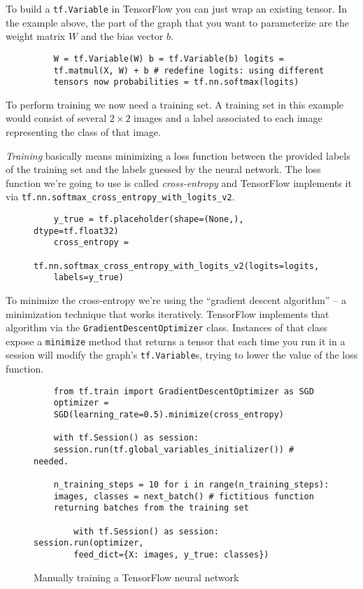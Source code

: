 To build a \texttt{tf.Variable} in TensorFlow you can just
wrap an existing tensor. In the example above, the part of
the graph that you want to parameterize are the weight
matrix $W$ and the bias vector $b$.

\begin{figure}
  \begin{verbatim}
    W = tf.Variable(W) b = tf.Variable(b) logits =
    tf.matmul(X, W) + b # redefine logits: using different
    tensors now probabilities = tf.nn.softmax(logits)
  \end{verbatim}
  \caption{}
\end{figure}

To perform training we now need a training set. A training
set in this example would consist of several \(2 \times 2\)
images and a label associated to each image representing the
class of that image.

\emph{Training} basically means minimizing a loss function
between the provided labels of the training set and the
labels guessed by the neural network. The loss function
we're going to use is called \emph{cross-entropy} and
TensorFlow implements it via
\texttt{tf.nn.softmax\_cross\_entropy\_with\_logits\_v2}.

\begin{figure}
  \begin{verbatim}
    y_true = tf.placeholder(shape=(None,), dtype=tf.float32)
    cross_entropy =
    tf.nn.softmax_cross_entropy_with_logits_v2(logits=logits,
    labels=y_true)
  \end{verbatim}
  \caption{}
\end{figure}

To minimize the cross-entropy we're using the ``gradient
descent algorithm'' -- a minimization technique that works
iteratively. TensorFlow implements that algorithm via the
\texttt{GradientDescentOptimizer} class. Instances of that
class expose a \texttt{minimize} method that returns a
tensor that each time you run it in a session will modify
the graph's \texttt{tf.Variable}s, trying to lower the value
of the loss function.

\begin{figure}
  \begin{verbatim}
    from tf.train import GradientDescentOptimizer as SGD
    optimizer =
    SGD(learning_rate=0.5).minimize(cross_entropy)

    with tf.Session() as session:
    session.run(tf.global_variables_initializer()) # needed.

    n_training_steps = 10 for i in range(n_training_steps):
    images, classes = next_batch() # fictitious function
    returning batches from the training set

        with tf.Session() as session: session.run(optimizer,
        feed_dict={X: images, y_true: classes})
  \end{verbatim}
  \caption{Manually training a TensorFlow neural network}
  \label{fig:training}
\end{figure}

